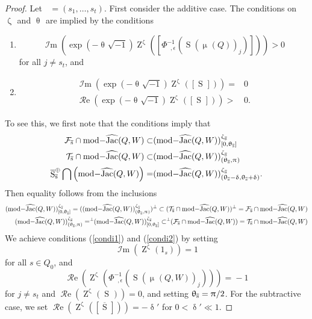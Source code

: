 \documentclass[a4paper,10pt]{amsart}
\DeclareMathOperator{\Z}{Z}
\DeclareMathOperator{\Simp}{S}
\newcommand{\shave}{\overline{\Simp}_{\Ss}}
\renewcommand{\theta}{\uptheta}
\renewcommand{\delta}{\updelta}
\renewcommand{\zeta}{\upzeta}
\renewcommand{\pi}{\uppi\hspace{0.05em}}
\renewcommand{\mu}{\upmu}
\DeclareMathOperator{\IIm}{\mathcal{I}m}
\DeclareMathOperator{\RRe}{\mathcal{R}e}
\DeclareMathOperator{\tmod}{mod-}
\newcommand{\rmod}[1]{\tmod\!#1}
\DeclareMathOperator{\HJac}{\widehat{Jac}}
\DeclareMathOperator{\Ss}{\overline{s}}
\begin{document}
\begin{proof}
Let $\Ss=(s_1,\ldots,s_t)$.  First consider the additive case.  The conditions on $\zeta_{\Ss}$ and $\theta_{\Ss}$ are implied by the conditions
\begin{enumerate}
\item
\label{condi1}
\[
\IIm\left(\exp(-\theta_{\Ss}\sqrt{-1})\Z^{\zeta_{\Ss}}\left([\Phi_{\Ss,\epsilon_{\Ss}}^{-1}(\Simp(\mu_{\Ss}(Q))_j)]\right)\right)> 0
\]
for all $j\neq s_t$, and
\item
\label{condi2}
\begin{align*}
\IIm\left(\exp(-\theta_{\Ss}\sqrt{-1})\Z^{\zeta_{\Ss}}([\Simp_{\Ss}])\right)= &0\\
\RRe\left(\exp(-\theta_{\Ss}\sqrt{-1})\Z^{\zeta_{\Ss}}([\Simp_{\Ss}])\right)> &0.
\end{align*}
\end{enumerate}
To see this, we first note that the conditions imply that 
\begin{align*}
\mathcal{F}_{\Ss}\cap \rmod{\HJac(Q,W)}\subset &(\rmod{\HJac(Q,W)})^{\zeta_{\Ss}}_{[0,\theta_{\Ss}]}\\
\mathcal{T}_{\Ss}\cap\rmod{\HJac(Q,W)}\subset &(\rmod{\HJac(Q,W)})^{\zeta_{\Ss}}_{(\theta_{\Ss},\pi)}\\
\shave^{\oplus}\bigcap \left(\rmod{\HJac(Q,W)}\right)=&(\rmod{\HJac(Q,W)})^{\zeta_{\Ss}}_{(\theta_{\Ss}-\delta,\theta_{\Ss}+\delta)}.
\end{align*}
Then equality follows from the inclusions
\begin{align*}
(\rmod{\HJac(Q,W)})^{\zeta_{\Ss}}_{[0,\theta_{\Ss}]}=((\rmod{\HJac(Q,W)})^{\zeta_{\Ss}}_{(\theta_{\Ss},\pi)})^{\perp}\subset (\mathcal{T}_{\Ss}\cap\rmod{\HJac(Q,W)})^{\perp}=\mathcal{F}_{\Ss}\cap \rmod{\HJac(Q,W)}\\
(\rmod{\HJac(Q,W)})^{\zeta_{\Ss}}_{(\theta_{\Ss},\pi)}=^\perp\!\!(\rmod{\HJac(Q,W)})^{\zeta_{\Ss}}_{[0,\theta_{\Ss}]}\subset^\perp\!\!(\mathcal{F}_{\Ss}\cap \rmod{\HJac(Q,W)})=\mathcal{T}_{\Ss}\cap\rmod{\HJac(Q,W)}
\end{align*}
We achieve conditions (\ref{condi1}) and (\ref{condi2}) by setting 
\begin{equation}
\label{strictStab}
\IIm(\Z^{\zeta_{\Ss}}(1_s))=1
\end{equation}
for all $s\in Q_0$, and 
\[
\RRe(\Z^{\zeta_{\Ss}}(\Phi_{\Ss,\epsilon_{\Ss}}^{-1}(\Simp(\mu_{\Ss}(Q,W))_j)))={}-1
\]
for $j\neq s_t$ and $\RRe(\Z^{\zeta_{\Ss}}(\Simp_{\Ss}))=0$, and setting $\theta_{\Ss}=\pi/2$.  For the subtractive case, we set $\RRe(\Z^{\zeta_{\Ss}}([\shave]))=-\delta'$ for $0<\delta'\ll 1$.
\end{proof}
\end{document}
